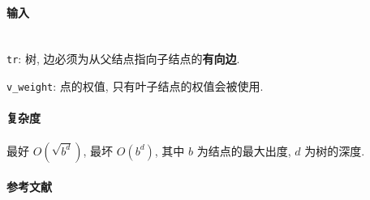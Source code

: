 \paragraph{输入}~\\

\verb|tr|: 树, 边必须为从父结点指向子结点的\textbf{有向边}.

\verb|v_weight|: 点的权值, 只有叶子结点的权值会被使用.

\paragraph{复杂度}

最好 \(O\left(\sqrt{b^d}\right)\), 最坏 \(O\left(b^d\right)\), 其中 \(b\) 为结点的最大出度, \(d\) 为树的深度.

\paragraph{参考文献} \cite{enwiki:1188156145}
